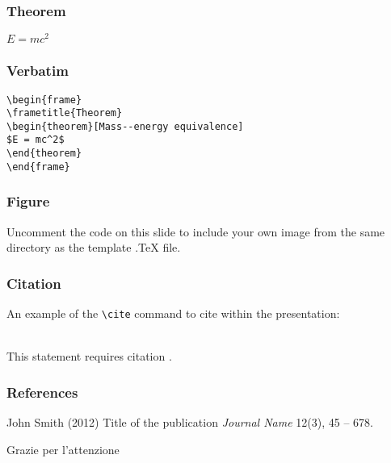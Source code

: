 \documentclass{beamer}
\begin{document}

\begin{frame}
\frametitle{Theorem}
\begin{theorem}
$E = mc^2$
\end{theorem}
\end{frame}


\begin{frame}[fragile] %
\frametitle{Verbatim}
\begin{example}
\begin{verbatim}
\begin{frame}
\frametitle{Theorem}
\begin{theorem}[Mass--energy equivalence]
$E = mc^2$
\end{theorem}
\end{frame}\end{verbatim}
\end{example}
\end{frame}


\begin{frame}
\frametitle{Figure}
Uncomment the code on this slide to include your own image from the same directory as the template .TeX file.
\end{frame}


\begin{frame}[fragile] %
\frametitle{Citation}
An example of the \verb|\cite| command to cite within the presentation:\\~

This statement requires citation \cite{p1}.
\end{frame}


\begin{frame}
\frametitle{References}
\footnotesize{
\begin{thebibliography}{99} %
 John Smith (2012)
\newblock Title of the publication
\newblock \emph{Journal Name} 12(3), 45 -- 678.
\end{thebibliography}
}
\end{frame}


\begin{frame}
  \Huge{\centerline{Grazie per l'attenzione}}
\end{frame}

\end{document}

